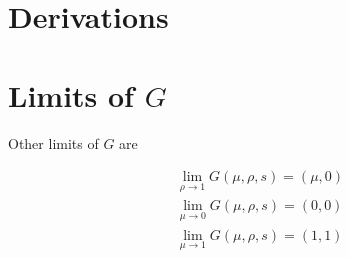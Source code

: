 \documentclass[../../main.tex]{subfiles}
\begin{document}
\section{Derivations}\label{appendix:derivations}


\section[Limits of Shift]{Limits of $G$}

Other limits of $G$ are

\begin{equation}
    \begin{split}
        \lim_{\rho \rightarrow 1} G(\mu, \rho, s) = (\mu, 0) \\
        \lim_{\mu \rightarrow 0} G(\mu, \rho, s) = (0, 0) \\
        \lim_{\mu \rightarrow 1} G(\mu, \rho, s) = (1, 1)
    \end{split}
\end{equation}
\end{document}
